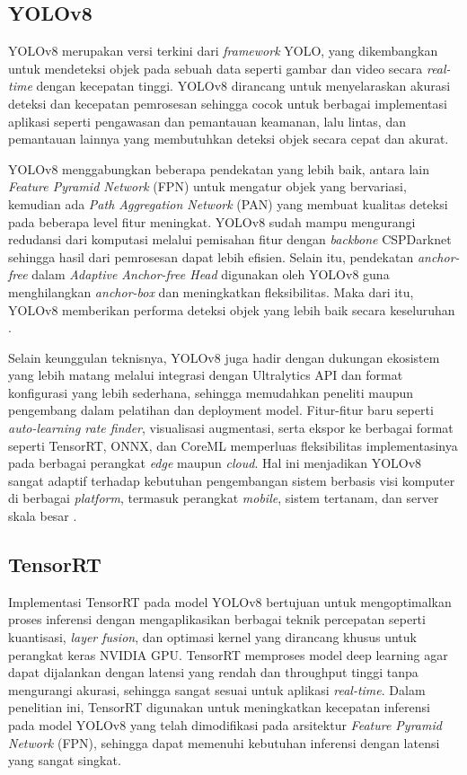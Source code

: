 \subsection{YOLOv8}
YOLOv8 merupakan versi terkini dari \emph{framework} YOLO, yang dikembangkan untuk mendeteksi objek pada sebuah data seperti gambar dan video secara \emph{real-time} dengan kecepatan tinggi. YOLOv8 dirancang untuk menyelaraskan akurasi deteksi dan kecepatan pemrosesan sehingga cocok untuk berbagai implementasi aplikasi seperti pengawasan dan pemantauan keamanan, lalu lintas, dan pemantauan lainnya yang membutuhkan deteksi objek secara cepat dan akurat.

YOLOv8 menggabungkan beberapa pendekatan yang lebih baik, antara lain \emph{Feature Pyramid Network} (FPN) untuk mengatur objek yang bervariasi, kemudian ada \emph{Path Aggregation Network} (PAN) yang membuat kualitas deteksi pada beberapa level fitur meningkat. YOLOv8 sudah mampu mengurangi redudansi dari komputasi melalui pemisahan fitur dengan \emph{backbone} CSPDarknet sehingga hasil dari pemrosesan dapat lebih efisien. Selain itu, pendekatan \emph{anchor-free} dalam \emph{Adaptive Anchor-free Head} digunakan oleh YOLOv8 guna menghilangkan \emph{anchor-box} dan meningkatkan fleksibilitas. Maka dari itu, YOLOv8 memberikan performa deteksi objek yang lebih baik secara keseluruhan \cite{yolov8}.

Selain keunggulan teknisnya, YOLOv8 juga hadir dengan dukungan ekosistem yang lebih matang melalui integrasi dengan Ultralytics API dan format konfigurasi yang lebih sederhana, sehingga memudahkan peneliti maupun pengembang dalam pelatihan dan deployment model. Fitur-fitur baru seperti \emph{auto-learning rate finder}, visualisasi augmentasi, serta ekspor ke berbagai format seperti TensorRT, ONNX, dan CoreML memperluas fleksibilitas implementasinya pada berbagai perangkat \emph{edge} maupun \emph{cloud}. Hal ini menjadikan YOLOv8 sangat adaptif terhadap kebutuhan pengembangan sistem berbasis visi komputer di berbagai \emph{platform}, termasuk perangkat \emph{mobile}, sistem tertanam, dan server skala besar \cite{jocher2023ultralytics}.

\subsection{TensorRT}
Implementasi TensorRT pada model YOLOv8 bertujuan untuk mengoptimalkan proses inferensi dengan mengaplikasikan berbagai teknik percepatan seperti kuantisasi, \emph{layer fusion}, dan optimasi kernel yang dirancang khusus untuk perangkat keras NVIDIA GPU. TensorRT memproses model deep learning agar dapat dijalankan dengan latensi yang rendah dan throughput tinggi tanpa mengurangi akurasi, sehingga sangat sesuai untuk aplikasi \emph{real-time}. Dalam penelitian ini, TensorRT digunakan untuk meningkatkan kecepatan inferensi pada model YOLOv8 yang telah dimodifikasi pada arsitektur \emph{Feature Pyramid Network} (FPN), sehingga dapat memenuhi kebutuhan inferensi dengan latensi yang sangat singkat.

